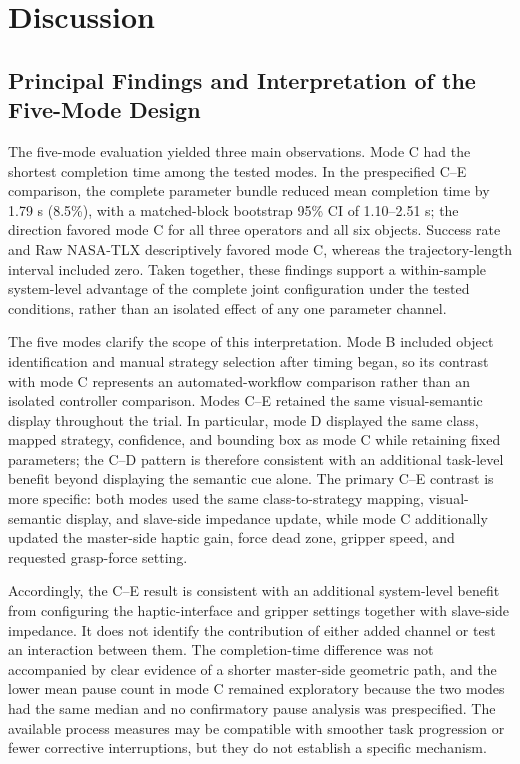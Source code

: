 \section{Discussion}
\subsection{Principal Findings and Interpretation of the Five-Mode Design}
The five-mode evaluation yielded three main observations. Mode C had the shortest completion time among the tested modes. In the prespecified C--E comparison, the complete parameter bundle reduced mean completion time by 1.79 s (8.5\%), with a matched-block bootstrap 95\% CI of 1.10--2.51 s; the direction favored mode C for all three operators and all six objects. Success rate and Raw NASA-TLX descriptively favored mode C, whereas the trajectory-length interval included zero. Taken together, these findings support a within-sample system-level advantage of the complete joint configuration under the tested conditions, rather than an isolated effect of any one parameter channel.

The five modes clarify the scope of this interpretation. Mode B included object identification and manual strategy selection after timing began, so its contrast with mode C represents an automated-workflow comparison rather than an isolated controller comparison. Modes C--E retained the same visual-semantic display throughout the trial. In particular, mode D displayed the same class, mapped strategy, confidence, and bounding box as mode C while retaining fixed parameters; the C--D pattern is therefore consistent with an additional task-level benefit beyond displaying the semantic cue alone. The primary C--E contrast is more specific: both modes used the same class-to-strategy mapping, visual-semantic display, and slave-side impedance update, while mode C additionally updated the master-side haptic gain, force dead zone, gripper speed, and requested grasp-force setting.

Accordingly, the C--E result is consistent with an additional system-level benefit from configuring the haptic-interface and gripper settings together with slave-side impedance. It does not identify the contribution of either added channel or test an interaction between them. The completion-time difference was not accompanied by clear evidence of a shorter master-side geometric path, and the lower mean pause count in mode C remained exploratory because the two modes had the same median and no confirmatory pause analysis was prespecified. The available process measures may be compatible with smoother task progression or fewer corrective interruptions, but they do not establish a specific mechanism.

